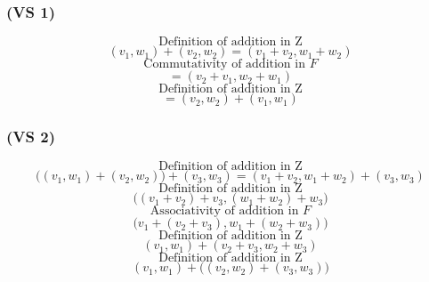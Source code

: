 \documentclass{article}
\begin{document}
\subsubsection*{(VS 1)}

\begin{equation*}
    \text{Definition of addition in Z}
\end{equation*}
\begin{equation*}
        (v_{1}, w_{1}) + (v_{2}, w_{2}) = (v_{1} + v_{2}, w_{1} + w_{2})
\end{equation*}
\begin{equation*}
    \text{Commutativity of addition in \(F\)}
\end{equation*}
\begin{equation*}
    = (v_{2} + v_{1}, w_{2} + w_{1})
\end{equation*}
\begin{equation*}
    \text{Definition of addition in Z}
\end{equation*}
\begin{equation*}
    = (v_{2}, w_{2}) + (v_{1}, w_{1})
\end{equation*}

\subsubsection*{(VS 2)}

\begin{equation*}
    \text{Definition of addition in Z}
\end{equation*}
\begin{equation*}
    \Big((v_{1}, w_{1}) + (v_{2}, w_{2})\Big) + (v_{3}, w_{3}) = (v_{1} + v_{2}, w_{1} + w_{2}) + (v_{3}, w_{3}) 
\end{equation*}
\begin{equation*}
    \text{Definition of addition in Z}
\end{equation*}
\begin{equation*}
    \Big((v_{1} + v_{2}) + v_{3}, (w_{1} + w_{2}) + w_{3}\Big)
\end{equation*}
\begin{equation*}
    \text{Associativity of addition in \(F\)}
\end{equation*}
\begin{equation*}
    \Big(v_{1} + (v_{2} + v_{3}), w_{1} + (w_{2} + w_{3})\Big)
\end{equation*}
\begin{equation*}
    \text{Definition of addition in Z}
\end{equation*}
\begin{equation*}
    (v_{1}, w_{1}) + (v_{2} + v_{3}, w_{2} + w_{3})
\end{equation*}
\begin{equation*}
    \text{Definition of addition in Z}
\end{equation*}
\begin{equation*}
    (v_{1}, w_{1}) + \Big((v_{2}, w_{2}) + (v_{3}, w_{3})\Big)
\end{equation*}
\end{document}
